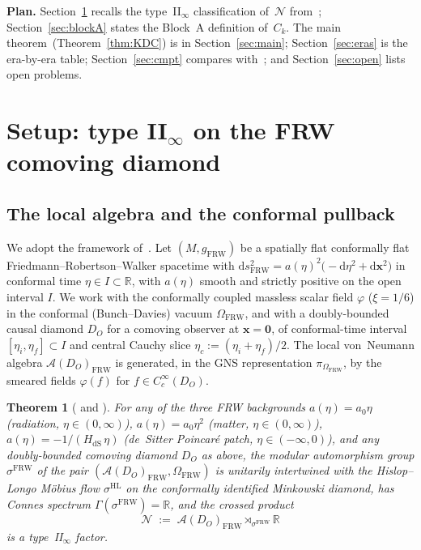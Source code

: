 \documentclass[11pt]{article}
\newtheorem{theorem}{Theorem}
\theoremstyle{definition}
\newcommand{\R}{\mathbb{R}}
\renewcommand{\AA}{\mathcal{A}}
\newcommand{\NN}{\mathcal{N}}
\newcommand{\HL}{\mathrm{HL}}
\newcommand{\FRW}{\mathrm{FRW}}
\begin{document}
\medskip\noindent\textbf{Plan.} Section~\ref{sec:setup} recalls
the type~II$_\infty$ classification of~$\NN$
from~\cite{Remondiere2026}; Section~\ref{sec:blockA} states the
Block~A definition of~$C_k$. The main
theorem~(Theorem~\ref{thm:KDC}) is in Section~\ref{sec:main};
Section~\ref{sec:eras} is the era-by-era table;
Section~\ref{sec:cmpt} compares with~\cite{CMPT24}; and
Section~\ref{sec:open} lists open problems.

\section{Setup: type \texorpdfstring{II$_\infty$}{II-infty} on the FRW comoving diamond}\label{sec:setup}

\subsection{The local algebra and the conformal pullback}

We adopt the framework of~\cite[\S\S2--3]{Remondiere2026}. Let
$(M, g_\FRW)$ be a spatially flat conformally flat
Friedmann--Robertson--Walker spacetime with
\(\mathrm{d}s^2_\FRW = a(\eta)^2\big(-\mathrm{d}\eta^2 + \mathrm{d}\mathbf{x}^2\big)\)
in conformal time $\eta\in I\subset\R$, with $a(\eta)$ smooth and
strictly positive on the open interval $I$. We work with the
conformally coupled massless scalar field $\varphi$ ($\xi = 1/6$) in
the conformal (Bunch--Davies) vacuum $\Omega_\FRW$, and with a
doubly-bounded causal diamond $D_O$ for a comoving observer at
$\mathbf{x} = \mathbf{0}$, of conformal-time interval
$[\eta_i,\eta_f]\subset I$ and central Cauchy slice
$\eta_c := (\eta_i + \eta_f)/2$. The local von~Neumann algebra
$\AA(D_O)_\FRW$ is generated, in the GNS representation
$\pi_{\Omega_\FRW}$, by the smeared fields $\varphi(f)$ for
$f\in C_c^\infty(D_O)$.

\begin{theorem}[{\cite[Thm.~3.5]{Remondiere2026} and \cite[Thm.~3.6, Cor.~3.7]{Remondiere2026}}]\label{thm:typeII}
For any of the three FRW backgrounds $a(\eta) = a_0\eta$
(radiation, $\eta\in(0,\infty)$), $a(\eta) = a_0\eta^2$
(matter, $\eta\in(0,\infty)$), $a(\eta) = -1/(H_{\mathrm{dS}}\,\eta)$
(de~Sitter Poincar\'e patch, $\eta\in(-\infty,0)$), and any
doubly-bounded comoving diamond $D_O$ as above, the modular
automorphism group $\sigma^\FRW$ of the pair
$(\AA(D_O)_\FRW, \Omega_\FRW)$ is unitarily intertwined with the
Hislop--Longo M\"obius flow $\sigma^\HL$ on the conformally
identified Minkowski diamond, has Connes spectrum $\Gamma(\sigma^\FRW)
= \R$, and the crossed product
\[
\NN \;:=\; \AA(D_O)_\FRW \rtimes_{\sigma^\FRW} \R
\]
is a type~II$_\infty$ factor.
\end{theorem}
\end{document}
